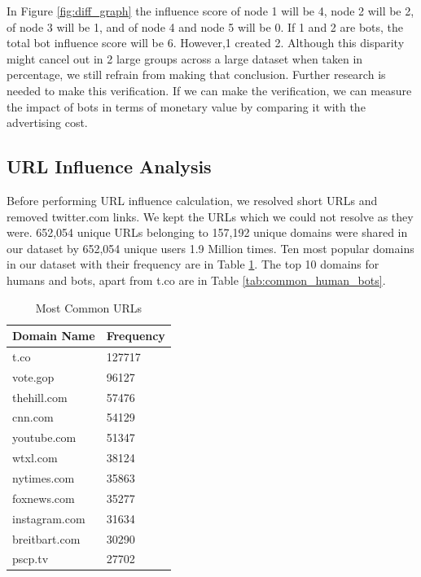 \documentclass[letterpaper]{article}
\begin{document}
In Figure \ref{fig:diff_graph} the influence score of node 1 will be 4, node 2 will be 2, of node 3 will be 1, and of node 4 and node 5 will be 0. If 1 and 2 are bots, 
the total bot influence score will be 6. However,1 created 
2. Although this disparity might cancel out in 2 large groups across a large dataset when taken in percentage, we still refrain from making that conclusion. 
Further research is needed to make 
this verification. If we can make the verification, we can measure the impact of bots in terms of monetary value by comparing it with the advertising cost.

\subsection{URL Influence Analysis}
Before performing URL influence calculation, we resolved short URLs and removed twitter.com links. We kept the URLs which we could not resolve as they were. 
652,054 unique URLs belonging to 157,192 unique domains were shared in our dataset by 652,054 unique users 1.9 Million times. Ten most popular domains in our dataset with their frequency are
in Table \ref{tab:Common_urls}. The top 10 domains for humans and bots, apart from t.co are in Table \ref{tab:common_human_bots}.

\begin{table}
    \centering
    \begin{tabular}{|l|l|}
    \hline
    \textbf{Domain Name} & \textbf{Frequency} \\ \hline
    t.co & 127717 \\ \hline
    vote.gop & 96127 \\ \hline
    thehill.com & 57476 \\ \hline
    cnn.com & 54129 \\ \hline
    youtube.com & 51347 \\ \hline
    wtxl.com & 38124 \\ \hline
    nytimes.com & 35863 \\ \hline
    foxnews.com & 35277 \\ \hline
    instagram.com & 31634 \\ \hline
    breitbart.com & 30290 \\ \hline
    pscp.tv & 27702 \\ \hline
    \end{tabular}
    \caption{Most Common URLs}
    \label{tab:Common_urls}
\end{table}
\end{document}
